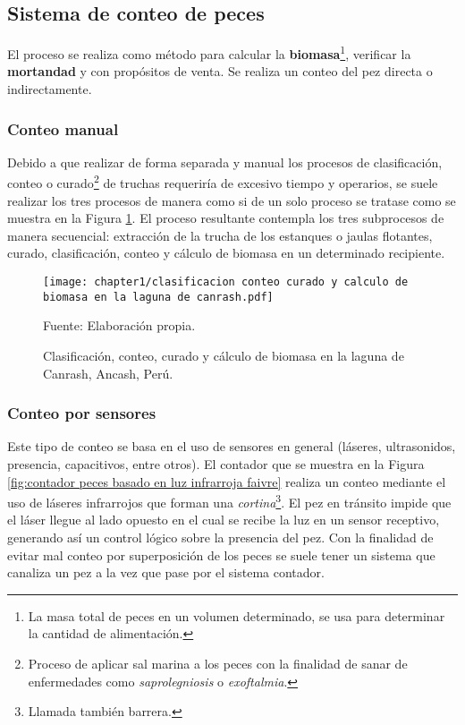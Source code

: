 \subsection{Sistema de conteo de peces}

El proceso se realiza como método para calcular la \textbf{biomasa}\footnote{La masa total de peces en un volumen determinado, se usa para determinar la cantidad de alimentación.}, verificar la \textbf{mortandad} y con propósitos de venta. Se realiza un conteo del pez directa o indirectamente. 

\subsubsection{Conteo manual}

Debido a que realizar de forma separada y manual los procesos de clasificación, conteo o curado\footnote{Proceso de aplicar sal marina a los peces con la finalidad de sanar de enfermedades como \textit{saprolegniosis} o \textit{exoftalmia}.}  de truchas requeriría de excesivo tiempo y operarios, se suele realizar los tres procesos de manera como si de un solo proceso se tratase como se muestra en la Figura \ref{fig:clasificacion conteo curado y calculo de biomasa en la laguna de canrash}. El proceso resultante contempla los tres subprocesos de manera secuencial: extracción de la trucha de los estanques o jaulas flotantes, curado, clasificación, conteo y cálculo de biomasa en un determinado recipiente.\\

\begin{figure}[H]
	\centering
	\texttt{[image: chapter1/clasificacion conteo curado y calculo de biomasa en la laguna de canrash.pdf]}
	\caption{Clasificación, conteo, curado y cálculo de biomasa en la laguna de Canrash, Ancash, Perú.}
	\begin{myflushleftportland}
		Fuente: Elaboración propia.
	\end{myflushleftportland}
	\label{fig:clasificacion conteo curado y calculo de biomasa en la laguna de canrash}
\end{figure}

\subsubsection{Conteo por sensores}

Este tipo de conteo se basa en el uso de sensores en general (láseres, ultrasonidos, presencia, capacitivos, entre otros).  El contador que se muestra en la Figura \ref{fig:contador peces basado en luz infrarroja faivre} realiza un conteo mediante el uso de láseres infrarrojos que forman una \textit{cortina}\footnote{Llamada también barrera.}. El pez en tránsito impide que el láser llegue al lado opuesto en el cual se recibe la luz en un sensor receptivo, generando así un control lógico sobre la presencia del pez. Con la finalidad de evitar mal conteo por superposición de los peces se suele tener un sistema que canaliza un pez a la vez que pase por el sistema contador.

